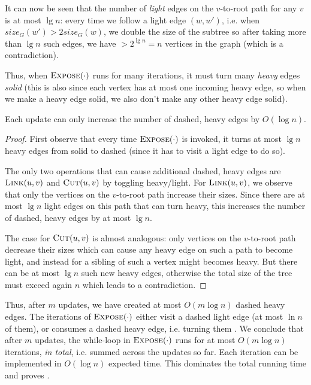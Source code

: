 It can now be seen that the number of \emph{light} edges on the $v$-to-root path for any $v$ is at most $\lg n$: every time we follow a light edge $(w,w')$, i.e. when $size_G(w') > 2 size_G(w)$, we double the size of the subtree so after taking more than $\lg n$ such edges, we have $> 2^{\lg n} = n$ vertices in the graph (which is a contradiction).

Thus, when $\textsc{Expose}(\cdot)$ runs for many iterations, it must turn many \emph{heavy} edges \emph{solid} (this is also since each vertex has at most one incoming heavy edge, so when we make a heavy edge solid, we also don't make any other heavy edge solid). 

\begin{claim}
Each update can only increase the number of dashed, heavy edges by $O(\log n)$. 
\end{claim}
\begin{proof}
First observe that every time $\textsc{Expose}(\cdot)$ is invoked, it turns at most $\lg n$ heavy edges from solid to dashed (since it has to visit a light edge to do so).

The only two operations that can cause additional dashed, heavy edges are $\textsc{Link}(u,v)$ and $\textsc{Cut}(u,v)$ by toggling heavy/light. For $\textsc{Link}(u,v)$, we observe that only the vertices on the $v$-to-root path increase their sizes. Since there are at most $\lg n$ light edges on this path that can turn heavy, this increases the number of dashed, heavy edges by at most $\lg n$. 

The case for $\textsc{Cut}(u,v)$ is almost analogous: only vertices on the $v$-to-root path decrease their sizes which can cause any heavy edge on such a path to become light, and instead for a sibling of such a vertex might becomes heavy. But there can be at most $\lg n$ such new heavy edges, otherwise the total size of the tree must exceed again $n$ which leads to a contradiction.
\end{proof}

Thus, after $m$ updates, we have created at most $O(m \log n)$ dashed heavy edges. The iterations of $\textsc{Expose}(\cdot)$ either visit a dashed light edge (at most $\ln n$ of them), or consumes a dashed heavy edge, i.e. turning them .
We conclude that after $m$ updates, the while-loop in $\textsc{Expose}(\cdot)$ runs for at most $O(m \log n)$ iterations, \emph{in total}, i.e. summed across the updates so far. Each iteration can be implemented in $O(\log n)$ expected time. This dominates the total running time and proves .

